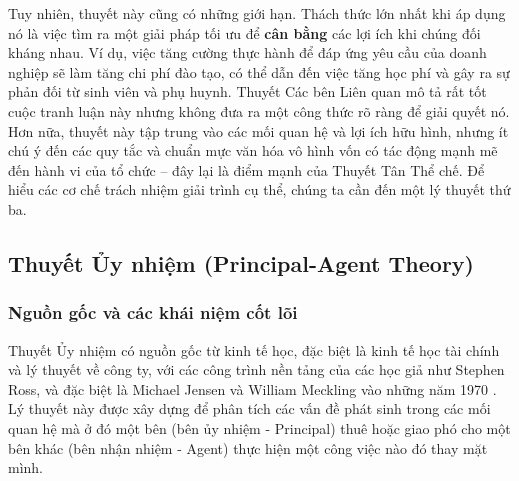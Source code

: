 \documentclass[12pt, a4paper, openany]{report}
\begin{document}
Tuy nhiên, thuyết này cũng có những giới hạn. Thách thức lớn nhất khi áp dụng nó là việc tìm ra một giải pháp tối ưu để \textbf{cân bằng} các lợi ích khi chúng đối kháng nhau. Ví dụ, việc tăng cường thực hành để đáp ứng yêu cầu của doanh nghiệp sẽ làm tăng chi phí đào tạo, có thể dẫn đến việc tăng học phí và gây ra sự phản đối từ sinh viên và phụ huynh. Thuyết Các bên Liên quan mô tả rất tốt cuộc tranh luận này nhưng không đưa ra một công thức rõ ràng để giải quyết nó. Hơn nữa, thuyết này tập trung vào các mối quan hệ và lợi ích hữu hình, nhưng ít chú ý đến các quy tắc và chuẩn mực văn hóa vô hình vốn có tác động mạnh mẽ đến hành vi của tổ chức – đây lại là điểm mạnh của Thuyết Tân Thể chế. Để hiểu các cơ chế trách nhiệm giải trình cụ thể, chúng ta cần đến một lý thuyết thứ ba.

\subsection{Thuyết Ủy nhiệm (Principal-Agent Theory)}
\label{subsec:uy_nhiem_nen_tang}

\subsubsection{Nguồn gốc và các khái niệm cốt lõi}
Thuyết Ủy nhiệm có nguồn gốc từ kinh tế học, đặc biệt là kinh tế học tài chính và lý thuyết về công ty, với các công trình nền tảng của các học giả như Stephen Ross, và đặc biệt là Michael Jensen và William Meckling vào những năm 1970 \cite{JensenMeckling1976}. Lý thuyết này được xây dựng để phân tích các vấn đề phát sinh trong các mối quan hệ mà ở đó một bên (bên ủy nhiệm - Principal) thuê hoặc giao phó cho một bên khác (bên nhận nhiệm - Agent) thực hiện một công việc nào đó thay mặt mình.
\end{document}
